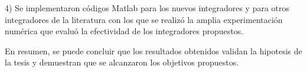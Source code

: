 \begin{conclusions}
	4) Se implementaron códigos Matlab para los nuevos integradores y para otros integradores de la literatura con los que se realizó la amplia experimentación numérica que evaluó la efectividad de los integradores propuestos.
	
	En resumen, se puede concluir que los resultados obtenidos validan la hipotesis de la tesis y demuestran que se alcanzaron los objetivos propuestos. 
	
	
	

	



\end{conclusions}
